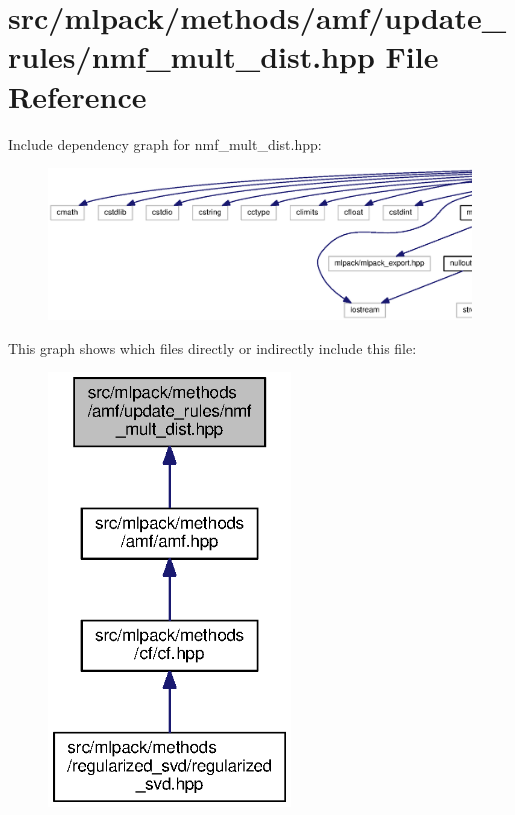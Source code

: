 \section{src/mlpack/methods/amf/update\+\_\+rules/nmf\+\_\+mult\+\_\+dist.hpp File Reference}
\label{nmf__mult__dist_8hpp}
Include dependency graph for nmf\+\_\+mult\+\_\+dist.\+hpp\+:
\nopagebreak
\begin{figure}[H]
\begin{center}
\leavevmode
\includegraphics[width=350pt]{nmf__mult__dist_8hpp__incl}
\end{center}
\end{figure}
This graph shows which files directly or indirectly include this file\+:
\nopagebreak
\begin{figure}[H]
\begin{center}
\leavevmode
\includegraphics[width=182pt]{nmf__mult__dist_8hpp__dep__incl}
\end{center}
\end{figure}
